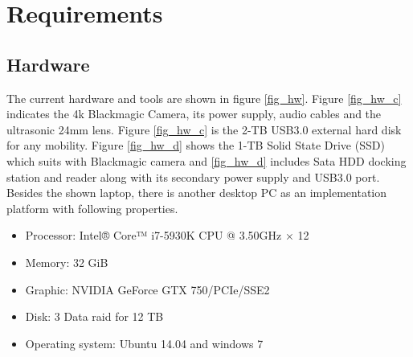 \documentclass[[12pt,DIV14,BCOR12mm,a4paper,footexclude,headinclude,halfparskip-,twoside,openright,cleardoubleempty,idxtotoc,bibtotoc]{article}
\begin{document}
\section{Requirements}




\subsection{Hardware}

The current hardware and tools are shown in figure \ref{fig_hw}. Figure \ref{fig_hw_c} indicates the 4k Blackmagic Camera, its power supply, audio cables and the ultrasonic 24mm lens. Figure \ref{fig_hw_c} is the 2-TB USB3.0 external hard disk for any mobility.  Figure \ref{fig_hw_d} shows the 1-TB Solid State Drive (SSD) which suits with Blackmagic camera and \ref{fig_hw_d} includes Sata HDD docking station and reader along with its secondary power supply and USB3.0 port. Besides the shown laptop, there is another desktop PC as an implementation platform with following properties.

\begin{itemize}
	\item Processor: Intel® Core™ i7-5930K CPU @ 3.50GHz × 12 
	\item Memory: 32 GiB
	\item Graphic: NVIDIA GeForce GTX 750/PCIe/SSE2
	\item Disk: 3 Data raid for 12 TB
	\item Operating system: Ubuntu 14.04 and windows 7
\end{itemize}
\end{document}
